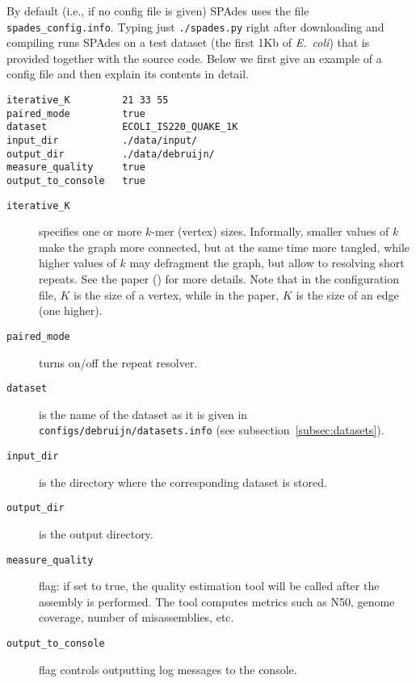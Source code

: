 \documentclass{article}
\def\spades{SPAdes}
\def\ecoli{\it E.~coli}
\begin{document}
By default (i.e., if no config file is given) {\spades} uses the file {\tt spades\_config.info}. 
Typing just {\tt ./spades.py} right after downloading and compiling runs {\spades}
on a test dataset (the first 1Kb of {\ecoli}) that is provided together with the source code.
Below we first give an example of a config file
and then explain its contents in detail.

\begin{lstlisting}																																																																																																																																																																																																																																																																																																																			
iterative_K         21 33 55
paired_mode         true 
dataset             ECOLI_IS220_QUAKE_1K
input_dir           ./data/input/
output_dir          ./data/debruijn/
measure_quality     true
output_to_console   true
\end{lstlisting}

\begin{description}
\item[{\tt iterative\_K}] specifies one or more $k$-mer (vertex) sizes.  Informally, smaller values of $k$ make the graph more connected, but at the same time more tangled, while higher values of $k$ may defragment the graph, but allow to resolving short repeats. See the paper (\cite{main}) for more details.  Note that in the configuration file, $K$ 
is the size of a vertex, while in the paper, $K$ is the size of an edge (one higher).
\item[{\tt paired\_mode}] turns on/off the repeat resolver.
\item[{\tt dataset}] is the name of the dataset as it is given in {\tt configs/debruijn/datasets.info} (see subsection~\ref{subsec:datasets}).
\item[{\tt input\_dir}] is the directory where the corresponding dataset is stored.
\item[{\tt output\_dir}] is the output directory.
\item[{\tt measure\_quality}] flag: if set to true, the quality estimation tool will be called after the assembly is performed.  The tool computes metrics such as N50, genome coverage, number of misassemblies, etc.
\item[{\tt output\_to\_console}] flag controls outputting log messages to the console.
\end{description}
\end{document}

